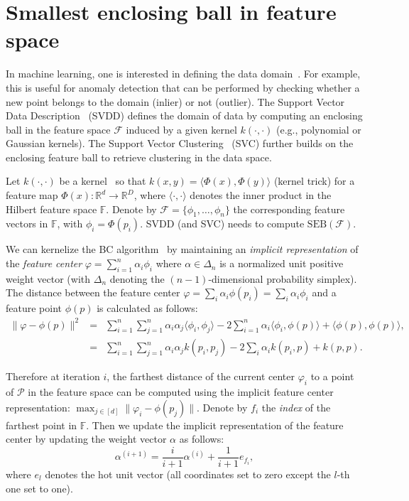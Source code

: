 \documentclass{article}
\def\calP{\mathcal{P}}
\def\calF{\mathcal{F}}
\def\bbR{\mathbb{R}}
\def\bbF{\mathbb{F}}
\def\SEB{\mathrm{SEB}}
\def\inner#1#2{\langle #1,#2\rangle}
\begin{document}
\section{Smallest enclosing ball in feature space}

In machine learning, one is interested in defining the data domain~\cite{SVDD-1999}.
For example, this is useful for anomaly detection that can be performed by checking whether a new point belongs to the domain (inlier) or not (outlier).
The Support Vector Data Description~\cite{SVDD-1999,SVDD-2004} (SVDD) defines the domain of data by computing an enclosing ball in the feature space $\calF$ induced by a given kernel $k(\cdot,\cdot)$ (e.g., polynomial or Gaussian kernels).
The Support Vector Clustering~\cite{SVC-2001} (SVC) further builds on the enclosing feature ball to retrieve clustering in the data space.

Let $k(\cdot,\cdot)$ be a kernel~\cite{kernel-2001} so that $k(x,y)=\inner{\Phi(x)}{\Phi(y)}$ (kernel trick) 
for a feature map $\Phi(x):\bbR^d\rightarrow \bbR^D$, where $\inner{\cdot}{\cdot}$
 denotes the inner product in the Hilbert feature space $\bbF$.
Denote by  $\calF=\{\phi_1,\ldots, \phi_n\}$  the corresponding feature vectors in $\bbF$, 
 with $\phi_i=\Phi(p_i)$.
SVDD (and SVC) needs to compute $\SEB(\calF)$.

We can kernelize the BC algorithm~\cite{BC-2003} by maintaining an {\em implicit representation} of the {\em feature center} 
$\varphi=\sum_{i=1}^n \alpha_i\phi_i$ where $\alpha\in\Delta_n$ is a normalized unit positive weight vector 
(with $\Delta_n$ denoting the $(n-1)$-dimensional probability simplex).
The distance between the feature center $\varphi=\sum_i \alpha_i\phi(p_i)=\sum_i \alpha_i\phi_i$ and a feature point $\phi(p)$ is calculated as follows:
\begin{eqnarray}
\|\varphi-\phi(p)\|^2 &=& \sum_{i=1}^n\sum_{j=1}^n \alpha_i\alpha_j\inner{\phi_i}{\phi_j} -2 \sum_{i=1}^n \alpha_i\inner{\phi_i}{\phi(p)} 
+\inner{\phi(p)}{\phi(p)},\\
&=& \sum_{i=1}^n\sum_{j=1}^n \alpha_i\alpha_j k(p_i,p_j) -2 \sum_i \alpha_i k(p_i,p)+ k(p,p). \label{eq:distk}
\end{eqnarray}

Therefore at iteration $i$, the farthest distance of the current center $\varphi_i$ to a point of $\calP$ in the feature space can be computed using the implicit feature center representation:
$\max_{j\in [d]} \|\varphi_i-\phi(p_j)\|$. Denote by $f_i$ the {\em index} of the farthest point in $\bbF$.
Then we update the implicit representation of the feature center by updating the weight vector $\alpha$ as follows:
$$
\alpha^{(i+1)} = \frac{i}{i+1} \alpha^{(i)} + \frac{1}{i+1} e_{f_i},
$$
where $e_l$ denotes the hot unit vector (all coordinates set to zero except the $l$-th one set to one).
\end{document}
